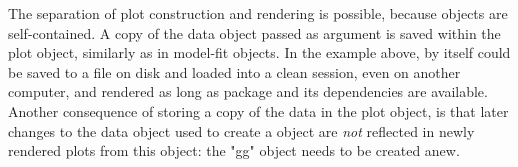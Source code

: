 \documentclass[krantz2]{krantz}\usepackage{knitr}
\begin{document}
\begin{warningbox}
The separation of plot construction and rendering is possible, because  objects are self-contained. A copy of the data object passed as argument is saved within the plot object, similarly as in model-fit objects. In the example above,  by itself could be saved to a file on disk and loaded into a clean \Rlang session, even on another computer, and rendered as long as package \ggplot and its dependencies are available. Another consequence of storing a copy of the data in the plot object, is that later changes to the data object used to create a  object are \emph{not} reflected in newly rendered plots from this object: the "gg" object needs to be created anew.
\end{warningbox}
\end{document}
